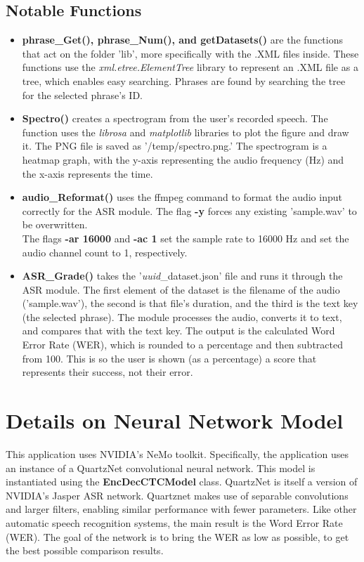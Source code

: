 \documentclass[12pt, letterpaper]{article}
\begin{document}
\subsection*{Notable Functions}
\begin{itemize}
\item{\textbf{phrase\_Get(), phrase\_Num(), and getDatasets()} are the functions that act on the folder 'lib', more specifically with the .XML files inside. These functions use the \textit{xml.etree.ElementTree} library to represent an .XML file as a tree, which enables easy searching. Phrases are found by searching the tree for the selected phrase's ID.}

\item{\textbf{Spectro()} creates a spectrogram from the user's recorded speech. The function uses the \textit{librosa} and \textit{matplotlib} libraries to plot the figure and draw it. The PNG file is saved as '/temp/spectro.png.' The spectrogram is a heatmap graph, with the y-axis representing the audio frequency (Hz) and the x-axis represents the time.}

\item{\textbf{audio\_Reformat()} uses the ffmpeg command to format the audio input correctly for the ASR module. The flag \textbf{-y} forces any existing 'sample.wav' to be overwritten. \\The flags \textbf{-ar 16000} and \textbf{-ac 1} set the sample rate to 16000 Hz and set the audio channel count to 1, respectively.}

\item{\textbf{ASR\_Grade()} takes the '\textit{uuid}_dataset.json' file and runs it through the ASR module. The first element of the dataset is the filename of the audio ('sample.wav'), the second is that file's duration, and the third is the text key (the selected phrase). The module processes the audio, converts it to text, and compares that with the text key. The output is the calculated Word Error Rate (WER), which is rounded to a percentage and then subtracted from 100. This is so the user is shown (as a percentage) a score that represents their success, not their error.}
\end{itemize}
\newpage%


\section*{Details on Neural Network Model}
This application uses NVIDIA's NeMo toolkit. Specifically, the application uses an instance of a QuartzNet convolutional neural network. This model is instantiated using the \textbf{EncDecCTCModel} class. QuartzNet is itself a version of NVIDIA's Jasper ASR network. Quartznet makes use of separable convolutions and larger filters, enabling similar performance with fewer parameters. Like other automatic speech recognition systems, the main result is the Word Error Rate (WER). The goal of the network is to bring the WER as low as possible, to get the best possible comparison results. 
\end{document}
